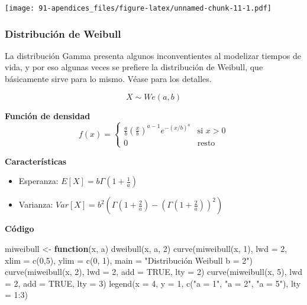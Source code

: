 \documentclass[
]{article}
\newenvironment{Shaded}{\begin{snugshade}}{\end{snugshade}}
\newcommand{\AttributeTok}[1]{\textcolor[rgb]{0.77,0.63,0.00}{#1}}
\newcommand{\ConstantTok}[1]{\textcolor[rgb]{0.00,0.00,0.00}{#1}}
\newcommand{\ControlFlowTok}[1]{\textcolor[rgb]{0.13,0.29,0.53}{\textbf{#1}}}
\newcommand{\DecValTok}[1]{\textcolor[rgb]{0.00,0.00,0.81}{#1}}
\newcommand{\FunctionTok}[1]{\textcolor[rgb]{0.00,0.00,0.00}{#1}}
\newcommand{\NormalTok}[1]{#1}
\newcommand{\OtherTok}[1]{\textcolor[rgb]{0.56,0.35,0.01}{#1}}
\newcommand{\SpecialCharTok}[1]{\textcolor[rgb]{0.00,0.00,0.00}{#1}}
\newcommand{\StringTok}[1]{\textcolor[rgb]{0.31,0.60,0.02}{#1}}
\providecommand{\tightlist}{%
  \setlength{\itemsep}{0pt}\setlength{\parskip}{0pt}}
\begin{document}
\texttt{[image: 91-apendices\_files/figure-latex/unnamed-chunk-11-1.pdf]}

\hypertarget{distribuciuxf3n-de-weibull}{%
\subsubsection{Distribución de
Weibull}\label{distribuciuxf3n-de-weibull}}

La distribución Gamma presenta algunos inconventientes al modelizar
tiempos de vida, y por eso algunas veces se prefiere la distribución de
Weibull, que básicamente sirve para lo mismo. Véase \cite{ugarte2015}
para los detalles.

\[X \sim \mathit{We}(a, b) \]

\textbf{Función de densidad} \[f(x) =
\begin{cases}
\frac{a}{b}\left (\frac{x}{b} \right)^{a-1}e^{-(x/b)^a} & \text{si } x > 0\\
0 & \text{resto }
\end{cases}\]

\textbf{Características}

\begin{itemize}
\tightlist
\item
  Esperanza: \(E[X] =b \Gamma\left (1 + \frac{1}{a} \right )\)
\item
  Varianza:
  \(\mathit{Var}[X] = b^2 \left ( \Gamma \left (  1 + \frac{2}{a} \right  )  - \left ( \Gamma \left (1 + \frac{2}{a} \right ) \right )^2 \right )\)
\end{itemize}

\textbf{Código}

\begin{Shaded}
\begin{Highlighting}[]
\NormalTok{miweibull }\OtherTok{\textless{}{-}} \ControlFlowTok{function}\NormalTok{(x, a) }\FunctionTok{dweibull}\NormalTok{(x, a, }\DecValTok{2}\NormalTok{)}
\FunctionTok{curve}\NormalTok{(}\FunctionTok{miweibull}\NormalTok{(x, }\DecValTok{1}\NormalTok{), }\AttributeTok{lwd =} \DecValTok{2}\NormalTok{, }\AttributeTok{xlim =} \FunctionTok{c}\NormalTok{(}\DecValTok{0}\NormalTok{,}\DecValTok{5}\NormalTok{), }
      \AttributeTok{ylim =} \FunctionTok{c}\NormalTok{(}\DecValTok{0}\NormalTok{, }\DecValTok{1}\NormalTok{),}
      \AttributeTok{main =} \StringTok{"Distribución Weibull b = 2"}\NormalTok{)}
\FunctionTok{curve}\NormalTok{(}\FunctionTok{miweibull}\NormalTok{(x, }\DecValTok{2}\NormalTok{), }\AttributeTok{lwd =} \DecValTok{2}\NormalTok{, }\AttributeTok{add =} \ConstantTok{TRUE}\NormalTok{, }\AttributeTok{lty =} \DecValTok{2}\NormalTok{)}
\FunctionTok{curve}\NormalTok{(}\FunctionTok{miweibull}\NormalTok{(x, }\DecValTok{5}\NormalTok{), }\AttributeTok{lwd =} \DecValTok{2}\NormalTok{, }\AttributeTok{add =} \ConstantTok{TRUE}\NormalTok{, }\AttributeTok{lty =} \DecValTok{3}\NormalTok{)}
\FunctionTok{legend}\NormalTok{(}\AttributeTok{x =} \DecValTok{4}\NormalTok{, }\AttributeTok{y =} \DecValTok{1}\NormalTok{, }\FunctionTok{c}\NormalTok{(}\StringTok{"a = 1"}\NormalTok{, }\StringTok{"a = 2"}\NormalTok{, }\StringTok{"a = 5"}\NormalTok{), }\AttributeTok{lty =} \DecValTok{1}\SpecialCharTok{:}\DecValTok{3}\NormalTok{)}
\end{Highlighting}
\end{Shaded}
\end{document}
